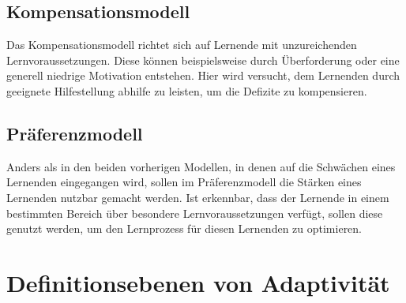 \subsection{Kompensationsmodell}
Das Kompensationsmodell richtet sich auf Lernende mit unzureichenden Lernvoraussetzungen.
Diese können beispielsweise durch Überforderung oder eine generell niedrige Motivation entstehen.
Hier wird versucht, dem Lernenden durch geeignete Hilfestellung abhilfe zu leisten, um die Defizite zu kompensieren.
\cite[S. 19]{lehmann2010lernstile}

\subsection{Präferenzmodell}
Anders als in den beiden vorherigen Modellen, in denen auf die Schwächen eines Lernenden eingegangen wird,
sollen im Präferenzmodell die Stärken eines Lernenden nutzbar gemacht werden. Ist erkennbar, dass
der Lernende in einem bestimmten Bereich über besondere Lernvoraussetzungen verfügt, sollen diese genutzt werden,
um den Lernprozess für diesen Lernenden zu optimieren.
\cite[S. 19]{lehmann2010lernstile}

\section{Definitionsebenen von Adaptivität}
